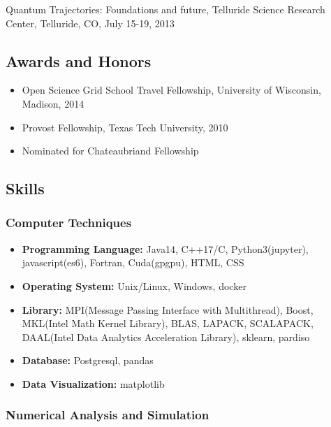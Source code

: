\documentclass[
]{article}
\providecommand{\tightlist}{%
  \setlength{\itemsep}{0pt}\setlength{\parskip}{0pt}}
\begin{document}
Quantum Trajectories: Foundations and future, Telluride Science Research
Center, Telluride, CO, July 15-19, 2013

\hypertarget{awards-and-honors}{%
\subsection{Awards and Honors}\label{awards-and-honors}}

\begin{itemize}
\tightlist
\item
  Open Science Grid School Travel Fellowship, University of Wisconsin,
  Madison, 2014
\item
  Provost Fellowship, Texas Tech University, 2010
\item
  Nominated for Chateaubriand Fellowship
\end{itemize}

\hypertarget{skills}{%
\subsection{Skills}\label{skills}}

\hypertarget{computer-techniques}{%
\subsubsection{Computer Techniques}\label{computer-techniques}}

\begin{itemize}
\tightlist
\item
  \textbf{Programming Language:} Java14, C++17/C, Python3(jupyter),
  javascript(es6), Fortran, Cuda(gpgpu), HTML, CSS
\item
  \textbf{Operating System:} Unix/Linux, Windows, docker
\item
  \textbf{Library:} MPI(Message Passing Interface with Multithread),
  Boost, MKL(Intel Math Kernel Library), BLAS, LAPACK, SCALAPACK,
  DAAL(Intel Data Analytics Acceleration Library), sklearn, pardiso
\item
  \textbf{Database:} Postgresql, pandas
\item
  \textbf{Data Visualization:} matplotlib
\end{itemize}

\hypertarget{numerical-analysis-and-simulation}{%
\subsubsection{Numerical Analysis and
Simulation}\label{numerical-analysis-and-simulation}}
\end{document}
